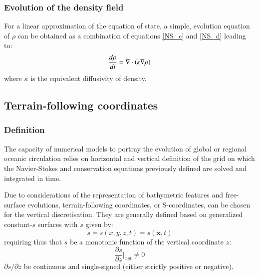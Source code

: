 \subsubsection{Evolution of the density field}
For a linear approximation of the equation of state, a simple, evolution equation of $\rho$ can be obtained as a combination of equations \ref{NS_c} and \ref{NS_d} leading to:
\begin{equation}
\displaystyle
\frac{d \rho}{d t}=
 \mathbf{\nabla}\cdot\color{black}(\kappa\mathbf{\nabla}{\rho})
\label{eq_diff_cart}
\end{equation}
where $\kappa$ is the equivalent diffusivity of density.

 
\subsection{Terrain-following coordinates}
\label{subsection_scoord}

\subsubsection{Definition}
The capacity of numerical models to portray the evolution of global or regional oceanic circulation relies on horizontal and vertical definition of the grid on which the Navier-Stokes and conservation equations previously defined are solved and integrated in time.

Due to considerations of the representation of bathymetric features and free-surface evolutions, terrain-following coordinates, or S-coordinates, can be chosen for the vertical discretisation. They are generally defined based on generalized constant-$s$ surfaces with $s$ given by:
\begin{equation}
 \displaystyle
 s=s(x,y,z,t)=s(\mathbf{x},t)
\end{equation}
requiring thus that $s$ be a monotonic function of the vertical coordinate $z$:
\begin{equation}
 \displaystyle
 \frac{\partial s}{\partial z}\bigg\vert_{xyt}\ne 0
\end{equation}
$\partial s / \partial z$ be continuous and single-signed (either strictly positive or negative).

